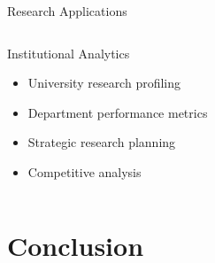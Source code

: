\documentclass[aspectratio=169]{beamer}
\begin{document}
\begin{frame}{Research Applications}
\begin{columns}[c]
\begin{column}{0.5\textwidth}
            \begin{block}{Institutional Analytics}
                \begin{itemize}
                    \item University research profiling
                    \item Department performance metrics
                    \item Strategic research planning
                    \item Competitive analysis
                \end{itemize}
            \end{block}
        \end{column}
    \end{columns}
\end{frame}

\section{Conclusion}
\end{document}
